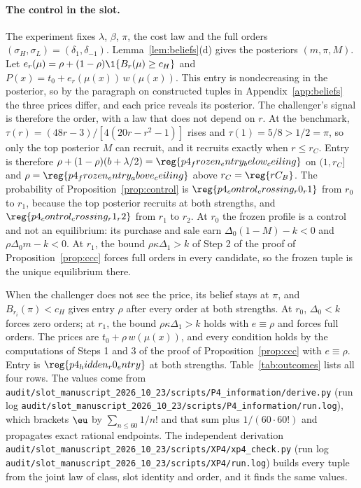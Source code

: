 \paragraph{The control in the slot.}
The experiment fixes \(\lambda\), \(\beta\), \(\pi\), the cost law and the full orders
\((\sigma_H,\sigma_L)=(\delta_1,\delta_{-1})\). Lemma~\ref{lem:beliefs}(d) gives the posteriors \((m,\pi,M)\). Let
\(e_r(\mu)=\rho+(1-\rho)\1\{B_r(\mu)\ge c_H\}\) and \(P(x)=t_0+e_r(\mu(x))\,w(\mu(x))\). This entry is nondecreasing
in the posterior, so by the paragraph on constructed tuples in Appendix~\ref{app:beliefs} the three prices differ,
and each price reveals its posterior. The challenger's signal is therefore the order, with a law that does not
depend on \(r\). At the benchmark, \(\tau(r)=(48r-3)/[4(20r-r^2-1)]\) rises and \(\tau(1)=5/8>1/2=\pi\), so only the
top posterior \(M\) can recruit, and it recruits exactly when \(r\le r_C\). Entry is therefore
\(\rho+(1-\rho)(b+\lambda/2)=\reg{p4_frozen_entry_below_ceiling}\) on \((1,r_C]\) and
\(\rho=\reg{p4_frozen_entry_above_ceiling}\) above \(r_C=\reg{rC_B}\). The probability of
Proposition~\ref{prop:control} is \(\reg{p4_control_crossing_r0_r1}\) from \(r_0\) to \(r_1\), because the top posterior
recruits at both strengths, and \(\reg{p4_control_crossing_r1_r2}\) from \(r_1\) to \(r_2\). At \(r_0\) the frozen profile
is a control and not an equilibrium: its purchase and sale earn \(\Delta_0(1-M)-k<0\) and \(\rho\Delta_0m-k<0\). At
\(r_1\), the bound \(\rho\kappa\Delta_1>k\) of Step 2 of the proof of Proposition~\ref{prop:ccc} forces full orders
in every candidate, so the frozen tuple is the unique equilibrium there.

When the challenger does not see the price, its belief stays at \(\pi\), and \(B_{r_i}(\pi)<c_H\) gives entry
\(\rho\) after every order at both strengths. At \(r_0\), \(\Delta_0<k\) forces zero orders; at \(r_1\), the bound
\(\rho\kappa\Delta_1>k\) holds with \(e\equiv\rho\) and forces full orders. The prices are
\(t_0+\rho\,w(\mu(x))\), and every condition holds by the computations of Steps 1 and 3 of the proof of
Proposition~\ref{prop:ccc} with \(e\equiv\rho\). Entry is \(\reg{p4_hidden_r0_entry}\) at both strengths.
Table~\ref{tab:outcomes} lists all four rows. The values come from
\nolinkurl{audit/slot_manuscript_2026_10_23/scripts/P4_information/derive.py} (run log
\nolinkurl{audit/slot_manuscript_2026_10_23/scripts/P4_information/run.log}), which brackets \(\eu\) by
\(\sum_{n\le60}1/n!\) and that sum plus \(1/(60\cdot60!)\) and propagates exact rational endpoints. The independent
derivation \nolinkurl{audit/slot_manuscript_2026_10_23/scripts/XP4/xp4_check.py} (run log
\nolinkurl{audit/slot_manuscript_2026_10_23/scripts/XP4/run.log}) builds every tuple from the joint law of class,
slot identity and order, and it finds the same values.

